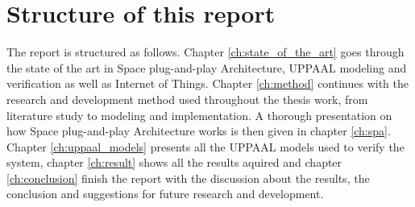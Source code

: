 \section{Structure of this report}
The report is structured as follows. Chapter \ref{ch:state_of_the_art} goes
through the state of the art in Space plug-and-play Architecture, UPPAAL
modeling and verification as well as Internet of Things.  Chapter
\ref{ch:method} continues with the research and development
method used throughout the thesis work, from literature study to modeling and
implementation. A thorough presentation on how Space plug-and-play Architecture 
works is then given in chapter \ref{ch:spa}. Chapter \ref{ch:uppaal_models}
presents all the UPPAAL models used to verify the system, chapter
\ref{ch:result} shows all the results aquired and chapter \ref{ch:conclusion}
finish the report with the discussion about the results, the conclusion and
suggestions for future research and development.

